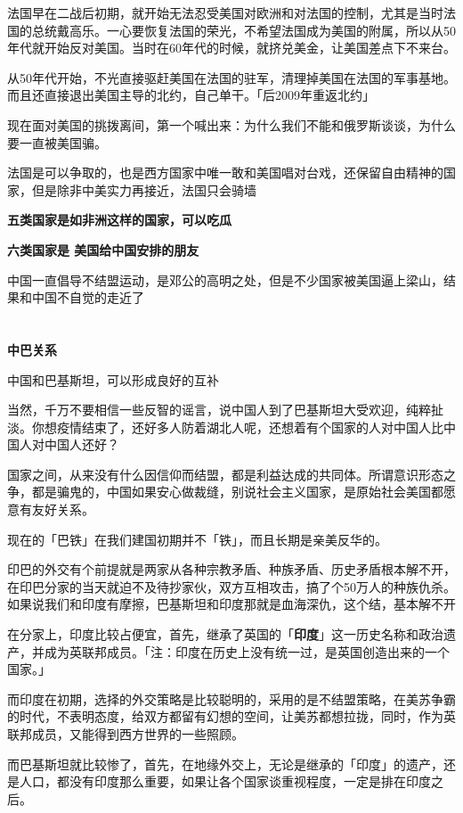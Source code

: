 \documentclass[UTF8, 11pt, oneside]{ctexart}
\newcommand{\zd}[1]{\textbf{\textcolor[RGB]{123,12,0}{#1}}} %
\begin{document}
法国早在二战后初期，就开始无法忍受美国对欧洲和对法国的控制，尤其是当时法国的总统戴高乐。一心要恢复法国的荣光，不希望法国成为美国的附属，所以从50年代就开始反对美国。当时在60年代的时候，就挤兑美金，让美国差点下不来台。

从50年代开始，不光直接驱赶美国在法国的驻军，清理掉美国在法国的军事基地。而且还直接退出美国主导的北约，自己单干。「后2009年重返北约」

现在面对美国的挑拨离间，第一个喊出来：为什么我们不能和俄罗斯谈谈，为什么要一直被美国骗。

法国是可以争取的，也是西方国家中唯一敢和美国唱对台戏，还保留自由精神的国家，但是除非中美实力再接近，法国只会骑墙

\zd{五类国家是如非洲这样的国家，可以吃瓜}

\zd{六类国家是 美国给中国安排的朋友}

中国一直倡导不结盟运动，是邓公的高明之处，但是不少国家被美国逼上梁山，结果和中国不自觉的走近了


\section{}

\zd{中巴关系}

中国和巴基斯坦，可以形成良好的互补

当然，千万不要相信一些反智的谣言，说中国人到了巴基斯坦大受欢迎，纯粹扯淡。你想疫情结束了，还好多人防着湖北人呢，还想着有个国家的人对中国人比中国人对中国人还好？

国家之间，从来没有什么因信仰而结盟，都是利益达成的共同体。所谓意识形态之争，都是骗鬼的，中国如果安心做裁缝，别说社会主义国家，是原始社会美国都愿意有友好关系。

现在的「巴铁」在我们建国初期并不「铁」，而且长期是亲美反华的。

印巴的外交有个前提就是两家从各种宗教矛盾、种族矛盾、历史矛盾根本解不开，在印巴分家的当天就迫不及待抄家伙，双方互相攻击，搞了个50万人的种族仇杀。如果说我们和印度有摩擦，巴基斯坦和印度那就是血海深仇，这个结，基本解不开

在分家上，印度比较占便宜，首先，继承了英国的「\zd{印度}」这一历史名称和政治遗产，并成为英联邦成员。「注：印度在历史上没有统一过，是英国创造出来的一个国家。」

而印度在初期，选择的外交策略是比较聪明的，采用的是不结盟策略，在美苏争霸的时代，不表明态度，给双方都留有幻想的空间，让美苏都想拉拢，同时，作为英联邦成员，又能得到西方世界的一些照顾。

而巴基斯坦就比较惨了，首先，在地缘外交上，无论是继承的「印度」的遗产，还是人口，都没有印度那么重要，如果让各个国家谈重视程度，一定是排在印度之后。
\end{document}
